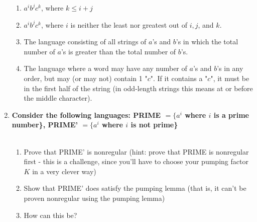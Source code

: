 \begin{enumerate}
\begin{enumerate}
	\item $a^ib^jc^k$, where $k \leq i+j$
	
	\item $a^ib^jc^k$, where $i$ is neither the least nor greatest out of $i,j$, and $k$.
	
	\item The language consisting of all strings of $a$'s and $b$'s in which the total number of $a$'s is greater than the total number of $b$'s.
	
	\item The language where a word may have any number of $a$'s and $b$'s in any order, but may (or may not) contain 1 "$c$". If it contains a "$c$", it must be in the first half of the string (in odd-length strings this means at or before the middle character).
	
\end{enumerate}


\newpage
\item \textbf{
	Consider the following languages: PRIME 
	$= \{a^i$ where $i$ is a prime number\},
    PRIME' $ = \{a^i$ where $i$ is not prime\}
}
\\\\
\begin{enumerate}
	\item Prove that PRIME' is nonregular (hint: prove that PRIME is nonregular first - this is a challenge, since you'll have to choose your pumping factor $K$ in a very clever way)
	
	\item Show that PRIME' does satisfy the pumping lemma (that is, it can't be proven nonregular using the pumping lemma)
	
	\item How can this be?
	
\end{enumerate}


\end{enumerate}


